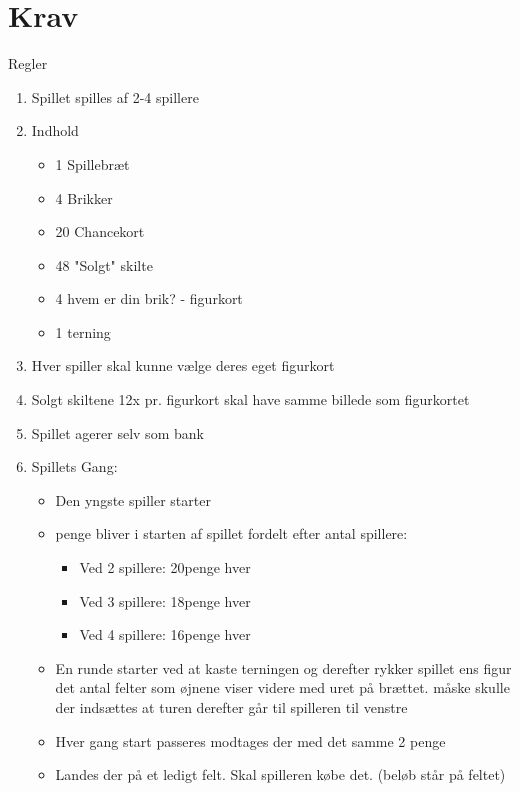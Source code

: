 \documentclass[../main.tex]{subfiles}
\begin{document}
\section{Krav}


{\Large Regler}

\begin{enumerate}
   \item Spillet spilles af 2-4 spillere
   \item Indhold
   \begin{itemize}
       \item 1 Spillebræt
       \item 4 Brikker
       \item 20 Chancekort
       \item 48 "Solgt" skilte
       \item 4 hvem er din brik? - figurkort
       \item 1 terning
   \end{itemize}
   \item Hver spiller skal kunne vælge deres eget figurkort    
   \item Solgt skiltene 12x pr. figurkort skal have samme billede som figurkortet
   \item Spillet agerer selv som bank
   \item Spillets Gang:
   \begin{itemize}
       \item Den yngste spiller starter
       \item \M penge bliver i starten af spillet fordelt efter antal spillere:
       \begin{itemize}
           \item Ved 2 spillere: 20\M penge hver
           \item Ved 3 spillere: 18\M penge hver
           \item Ved 4 spillere: 16\M penge hver
       \end{itemize}
       \item En runde starter ved at kaste terningen og derefter rykker spillet ens figur det antal felter som øjnene viser videre med uret på brættet. \todo måske skulle der indsættes at turen derefter går til spilleren til venstre
       \item Hver gang start passeres modtages der med det samme 2 \M penge
       \item Landes der på et ledigt felt. Skal spilleren købe det. (beløb står på feltet)
       \begin{itemize}

\end{itemize}
\end{itemize}
\end{enumerate}
\end{document}
